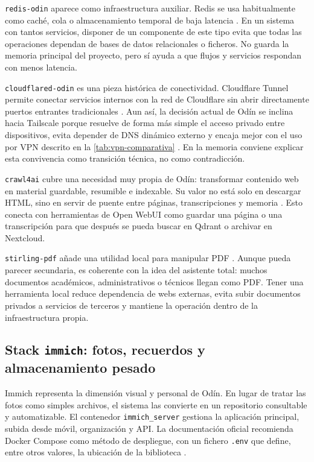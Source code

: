 \texttt{redis-odin} aparece como infraestructura auxiliar. Redis se usa habitualmente como caché, cola o almacenamiento temporal de baja latencia \citep{redisDocs}. En un sistema con tantos servicios, disponer de un componente de este tipo evita que todas las operaciones dependan de bases de datos relacionales o ficheros. No guarda la memoria principal del proyecto, pero sí ayuda a que flujos y servicios respondan con menos latencia.

\texttt{cloudflared-odin} es una pieza histórica de conectividad. Cloudflare Tunnel permite conectar servicios internos con la red de Cloudflare sin abrir directamente puertos entrantes tradicionales \citep{cloudflareTunnelDocs}. Aun así, la decisión actual de Odín se inclina hacia Tailscale porque resuelve de forma más simple el acceso privado entre dispositivos, evita depender de DNS dinámico externo y encaja mejor con el uso por VPN descrito en la \cref{tab:vpn-comparativa} \citep{tailscaleWhatIs,tailscaleDynamicIp}. En la memoria conviene explicar esta convivencia como transición técnica, no como contradicción.

\texttt{crawl4ai} cubre una necesidad muy propia de Odín: transformar contenido web en material guardable, resumible e indexable. Su valor no está solo en descargar HTML, sino en servir de puente entre páginas, transcripciones y memoria \citep{crawl4aiDocs}. Esto conecta con herramientas de Open WebUI como guardar una página o una transcripción para que después se pueda buscar en Qdrant o archivar en Nextcloud.

\texttt{stirling-pdf} añade una utilidad local para manipular PDF \citep{stirlingPdfDocs}. Aunque pueda parecer secundaria, es coherente con la idea del asistente total: muchos documentos académicos, administrativos o técnicos llegan como PDF. Tener una herramienta local reduce dependencia de webs externas, evita subir documentos privados a servicios de terceros y mantiene la operación dentro de la infraestructura propia.

\subsection{Stack \texttt{immich}: fotos, recuerdos y almacenamiento pesado}
Immich representa la dimensión visual y personal de Odín. En lugar de tratar las fotos como simples archivos, el sistema las convierte en un repositorio consultable y automatizable. El contenedor \texttt{immich\_server} gestiona la aplicación principal, subida desde móvil, organización y API. La documentación oficial recomienda Docker Compose como método de despliegue, con un fichero \texttt{.env} que define, entre otros valores, la ubicación de la biblioteca \citep{immichDockerInstall}.

